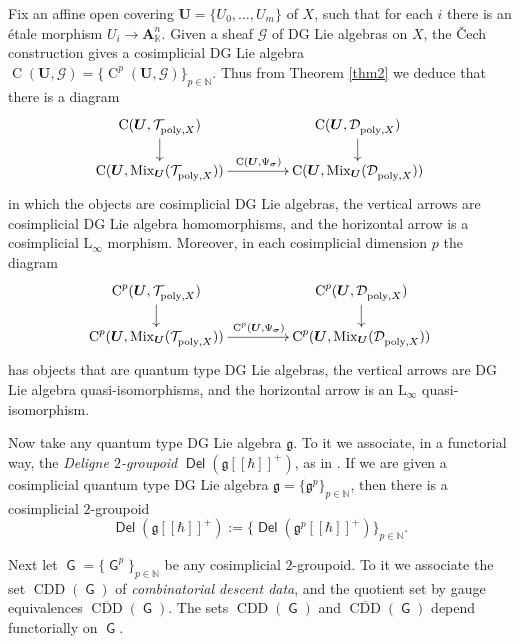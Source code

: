 \documentclass{conm-p-l}
\theoremstyle{definition}
\numberwithin{equation}{section}
\newcommand{\ol}{\overline}
\newcommand{\opn}{\operatorname}
\newcommand{\cat}[1]{\operatorname{\mathsf{#1}}}
\newcommand{\mfrak}[1]{\mathfrak{#1}}
\newcommand{\mcal}[1]{\mathcal{#1}}
\newcommand{\mbf}[1]{\mathbf{#1}}
\newcommand{\mrm}[1]{\mathrm{#1}}
\newcommand{\mbb}[1]{\mathbb{#1}}
\newcommand{\bsym}[1]{\boldsymbol{#1}}
\newcommand{\K}{\mbb{K}}
\newcommand{\g}{\mfrak{g}}
\begin{document}
Fix an affine open covering 
$\bsym{U} = \{ U_0, \ldots, U_m \}$ of $X$, such that for each $i$
there is an \'etale morphism 
$U_i \to \mbf{A}^n_{\K}$. 
Given a sheaf $\mcal{G}$ of DG Lie algebras on $X$, the \v{C}ech construction
gives a cosimplicial DG Lie algebra
$\opn{C}(\bsym{U}, \mcal{G}) = 
\{ \opn{C}^p(\bsym{U}, \mcal{G}) \}_{p \in \mbb{N}}$.
Thus from  Theorem \ref{thm2} we deduce that there is a diagram
\begin{equation} \label{eqn:last}
\UseTips \xymatrix @C=10ex @R=3.5ex {
\opn{C}(\bsym{U}, \mcal{T}^{}_{\mrm{poly}, X}) 
\ar[d]
& \opn{C}(\bsym{U}, \mcal{D}^{}_{\mrm{poly}, X})
\ar[d] \\
\opn{C}(\bsym{U}, \opn{Mix}_{\bsym{U}}(\mcal{T}^{}_{\mrm{poly}, X} ))
\ar[r]^{\opn{C}(\bsym{U}, \Psi_{\bsym{\sigma}})}
&
\opn{C}(\bsym{U}, \opn{Mix}_{\bsym{U}}(\mcal{D}^{}_{\mrm{poly}, X} ))
} 
\end{equation}
in which the objects are cosimplicial DG Lie algebras, the vertical arrows 
are cosimplicial DG Lie algebra homomorphisms, and the horizontal arrow is a
cosimplicial $\mrm{L}_{\infty}$ morphism. 
Moreover, in each cosimplicial dimension $p$ the diagram 
\[ \UseTips \xymatrix @C=10ex @R=3.5ex {
\opn{C}^p(\bsym{U}, \mcal{T}^{}_{\mrm{poly}, X}) 
\ar[d]
& \opn{C}^p(\bsym{U}, \mcal{D}^{}_{\mrm{poly}, X})
\ar[d] \\
\opn{C}^p(\bsym{U}, \opn{Mix}_{\bsym{U}}(\mcal{T}^{}_{\mrm{poly}, X} ))
\ar[r]^{\opn{C}^p(\bsym{U}, \Psi_{\bsym{\sigma}})}
&
\opn{C}^p(\bsym{U}, \opn{Mix}_{\bsym{U}}(\mcal{D}^{}_{\mrm{poly}, X} ))
} \] 
has objects that are quantum type DG Lie algebras, the vertical arrows 
are DG Lie algebra quasi-isomorphisms, and the horizontal arrow is an
$\mrm{L}_{\infty}$ quasi-isomorphism.

Now take any quantum type DG Lie algebra $\g$. To it we associate, in a
functorial way, the {\em Deligne $2$-groupoid} 
$\bsym{\cat{Del}}(\g[[\hbar]]^+)$, as in \cite{Ge}. 
If we are given a cosimplicial quantum type DG Lie algebra 
$\g = \{ \g^p \}_{p \in \mbb{N}}$, then there is  a cosimplicial
$2$-groupoid
\[ \bsym{\cat{Del}}(\g[[\hbar]]^+) := 
\bigl\{ \bsym{\cat{Del}}(\g^p[[\hbar]]^+) \bigr\}_{p \in \mbb{N}} . \]

Next let $\bsym{\cat{G}} = \{ \bsym{\cat{G}}^p \}_{p \in \mbb{N}}$ be any 
cosimplicial $2$-groupoid. To it we associate the set 
$\opn{CDD}(\bsym{\cat{G}})$ of {\em combinatorial descent data}, and the
quotient set by gauge equivalences $\ol{\opn{CDD}}(\bsym{\cat{G}})$.
The sets $\opn{CDD}(\bsym{\cat{G}})$ and $\ol{\opn{CDD}}(\bsym{\cat{G}})$
depend functorially on $\bsym{\cat{G}}$.
\end{document}
